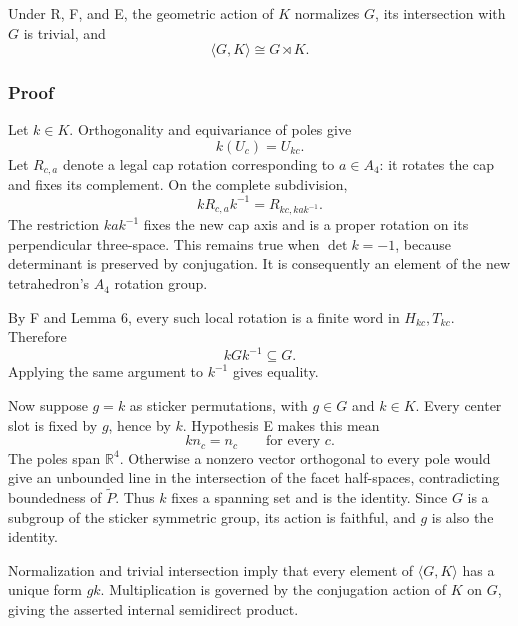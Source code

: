 \documentclass[
  10pt,
  a4paper,
]{article}
\begin{document}
Under R, F, and E, the geometric action of \(K\) normalizes \(G\), its
intersection with \(G\) is trivial, and \begin{equation}
\langle G,K\rangle\cong G\rtimes K.
\end{equation}

\subsubsection{Proof}\label{proof-11}

Let \(k\in K\). Orthogonality and equivariance of poles give
\begin{equation}
k(U_c)=U_{kc}.
\end{equation} Let \(R_{c,a}\) denote a legal cap rotation corresponding
to \(a\in A_4\): it rotates the cap and fixes its complement. On the
complete subdivision, \begin{equation}
kR_{c,a}k^{-1}=R_{kc,kak^{-1}}.
\end{equation} The restriction \(kak^{-1}\) fixes the new cap axis and
is a proper rotation on its perpendicular three-space. This remains true
when \(\det k=-1\), because determinant is preserved by conjugation. It
is consequently an element of the new tetrahedron's \(A_4\) rotation
group.

By F and Lemma 6, every such local rotation is a finite word in
\(H_{kc},T_{kc}\). Therefore \begin{equation}
kGk^{-1}\subseteq G.
\end{equation} Applying the same argument to \(k^{-1}\) gives equality.

Now suppose \(g=k\) as sticker permutations, with \(g\in G\) and
\(k\in K\). Every center slot is fixed by \(g\), hence by \(k\).
Hypothesis E makes this mean \begin{equation}
kn_c=n_c\qquad\text{for every }c.
\end{equation} The poles span \(\mathbb R^4\). Otherwise a nonzero
vector orthogonal to every pole would give an unbounded line in the
intersection of the facet half-spaces, contradicting boundedness of
\(\widetilde P\). Thus \(k\) fixes a spanning set and is the identity.
Since \(G\) is a subgroup of the sticker symmetric group, its action is
faithful, and \(g\) is also the identity.

Normalization and trivial intersection imply that every element of
\(\langle G,K\rangle\) has a unique form \(gk\). Multiplication is
governed by the conjugation action of \(K\) on \(G\), giving the
asserted internal semidirect product.
\end{document}

